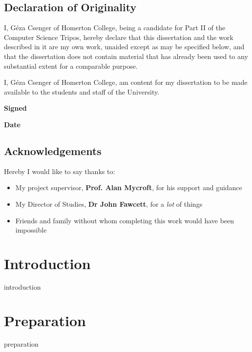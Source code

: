 \documentclass[oneside]{scrbook}
\begin{document}


\frontmatter

\section*{Declaration of Originality}

I, Géza Csenger of Homerton College,
being a candidate for Part II of the Computer Science Tripos,
hereby declare that this dissertation and the work described in it
are my own work, unaided except as may be specified below, and
that the dissertation does not contain material that has already
been used to any substantial extent for a comparable purpose.

I, Géza Csenger of Homerton College,
am content for my dissertation to be made available to the students and staff of the University. 

\vspace{1cm}
\textbf{Signed}

\vspace{1cm}
\textbf{Date}

\vspace{3cm}

\section*{Acknowledgements}

Hereby I would like to say thanks to:
\begin{itemize}
    \item My project supervisor, \textbf{Prof. Alan Mycroft}, for his support and guidance
    \item My Director of Studies, \textbf{Dr John Fawcett}, for a \emph{lot} of things
    \item Friends and family without whom completing this work would have been impossible
\end{itemize}

\tableofcontents
\listoffigures

\mainmatter

\chapter{Introduction}
{introduction}

\chapter{Preparation}
{preparation}
\end{document}
